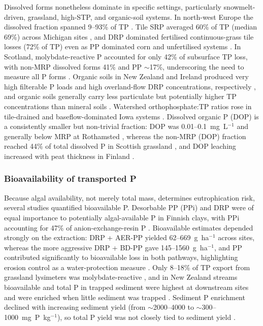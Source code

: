 Dissolved forms nonetheless dominate in specific settings, particularly
snowmelt-driven, grassland, high-STP, and organic-soil systems. In north-west
Europe the dissolved fraction spanned 9--93\% of TP \parencite{Ulén2007}. Tile SRP
averaged 60\% of TP (median 69\%) across Michigan sites \parencite{Clement2017}, and
DRP dominated fertilised continuous-grass tile losses (72\% of TP) even as PP
dominated corn and unfertilised systems \parencite{Zhang2015b}. In Scotland,
molybdate-reactive P accounted for only 42\% of subsurface TP loss, with non-MRP
dissolved forms 41\% and PP $\sim$17\%, underscoring the need to measure all P forms
\parencite{Hooda1999}. Organic soils in New Zealand and Ireland produced very high
filterable P loads and high overland-flow DRP concentrations, respectively
\parencite{McDowell2015b,Kurz2005}, and organic soils generally carry less
particulate but potentially higher TP concentrations than mineral soils
\parencite{Grenon2021}. Watershed orthophosphate:TP ratios rose in tile-drained and
baseflow-dominated Iowa systems \parencite{Schilling2017b}. Dissolved organic P
(DOP) is a consistently smaller but non-trivial fraction: DOP was 0.01--0.1~mg~L$^{-1}$
and generally below MRP at Rothamsted \parencite{Lu2003,Lu2004}, whereas the non-MRP
(DOP) fraction reached 44\% of total dissolved P in Scottish grassland
\parencite{Hooda1999}, and DOP leaching increased with peat thickness in Finland
\parencite{YliHalla2022}.

\subsubsection{Bioavailability of transported P}

Because algal availability, not merely total mass, determines eutrophication risk,
several studies quantified bioavailable P. Desorbable PP (PPi) and DRP were of equal
importance to potentially algal-available P in Finnish clays, with PPi accounting for
47\% of anion-exchange-resin P \parencite{Uusitalo2001}. Bioavailable estimates
depended strongly on the extraction: DRP + AER-PP yielded 62--669~g~ha$^{-1}$ across
sites, whereas the more aggressive DRP + BD-PP gave 145--1560~g~ha$^{-1}$, and PP
contributed significantly to bioavailable loss in both pathways, highlighting erosion
control as a water-protection measure \parencite{Uusitalo2003}. Only 8--18\% of TP
export from grassland lysimeters was molybdate-reactive \parencite{Bilotta2008}, and
in New Zealand streams bioavailable and total P in trapped sediment were highest at
downstream sites and were enriched when little sediment was trapped
\parencite{McDowell2004}. Sediment P enrichment declined with increasing sediment
yield (from $\sim$2000--4000 to $\sim$300--1000~mg~P~kg$^{-1}$), so total P yield was
not closely tied to sediment yield \parencite{Gillingham2000}.


